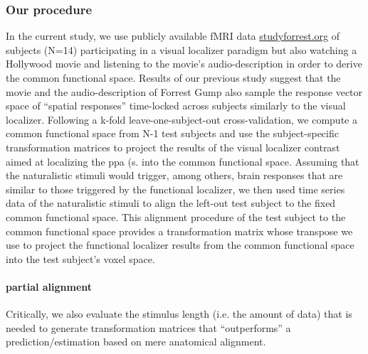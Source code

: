\subsubsection{Our procedure}


In the current study, we use publicly available fMRI data
\href{www.studyforrest.org}{studyforrest.org} of subjects (N=14) participating
in a visual localizer paradigm \citep{sengupta2016extension} but also watching a
Hollywood \citep{hanke2016simultaneous} movie and listening to the movie's
audio-description \citep{hanke2014audiomovie} in order to derive the common
functional space.
%
Results of our previous study suggest \citep{haeusler2022processing} that the
movie and the audio-description of Forrest Gump also sample the response vector
space of ``spatial responses'' time-locked across subjects similarly to the
visual localizer.
%
Following a k-fold leave-one-subject-out cross-validation, we compute a common
functional space from N-1 test subjects and use the subject-specific
transformation matrices to project the results of the visual localizer contrast
aimed at localizing the \ac{ppa} (s. \citet{sengupta2016extension} into the
common functional space.
Assuming that the naturalistic stimuli would trigger, among others, brain
responses that are similar to those triggered by the functional localizer, we
then used time series data of the naturalistic stimuli to align the left-out
test subject to the fixed common functional space.
This alignment procedure of the test subject to the common functional space
provides a transformation matrix whose transpose we use to project
the functional localizer results from the common functional space into the test
subject's voxel space.


\paragraph{partial alignment}



%
Critically, we also evaluate the stimulus length (i.e. the amount of data) that
is needed to generate transformation matrices that ``outperforms'' a
prediction/estimation based on mere anatomical alignment.

